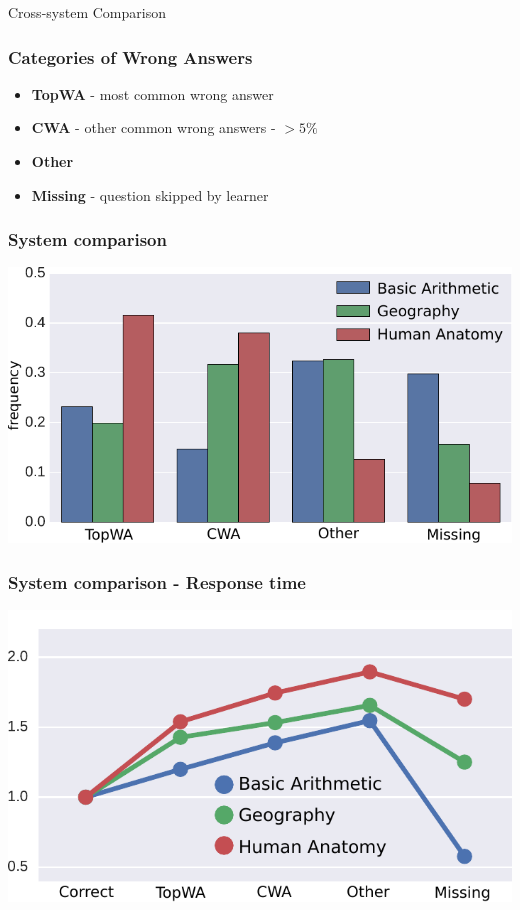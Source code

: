 \documentclass[xcolor=svgnames]{beamer}
\begin{document}



\begin{frame}
    \centering
    \huge Cross-system Comparison
\end{frame}
\begin{frame}
    \frametitle{Categories of Wrong Answers}
    \Large
    \begin{itemize}
        \item \textbf{TopWA} - most common wrong answer
        \item \textbf{CWA} - other common wrong answers - $> 5\%$
        \item \textbf{Other}
        \item \textbf{Missing} - question skipped by learner
    \end{itemize}
\end{frame}
\begin{frame}
    \frametitle{System comparison}
    \centering
    \includegraphics[width=\linewidth]{figures/system-comparison-distribution}
\end{frame}
\begin{frame}
    \frametitle{System comparison - Response time}
    \centering
    \includegraphics[width=0.8\linewidth]{figures/system-comparison-response-time}
\end{frame}
\end{document}
